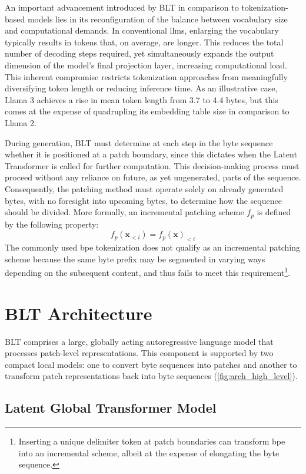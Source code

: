 An important advancement introduced by {\textsc BLT} in comparison to tokenization-based models lies in its reconfiguration of the balance between vocabulary size and computational demands. In conventional llms, enlarging the vocabulary typically results in tokens that, on average, are longer. This reduces the total number of decoding steps required, yet simultaneously expands the output dimension of the model’s final projection layer, increasing computational load. This inherent compromise restricts tokenization approaches from meaningfully diversifying token length or reducing inference time. As an illustrative case, Llama 3 achieves a rise in mean token length from 3.7 to 4.4 bytes, but this comes at the expense of quadrupling its embedding table size in comparison to Llama 2.

During generation, {\textsc BLT} must determine at each step in the byte sequence whether it is positioned at a patch boundary, since this dictates when the Latent Transformer is called for further computation. This decision-making process must proceed without any reliance on future, as yet ungenerated, parts of the sequence. Consequently, the patching method must operate solely on already generated bytes, with no foresight into upcoming bytes, to determine how the sequence should be divided. More formally, an incremental patching scheme $f_p$ is defined by the following property:
$$f_p(\pmb{x}_{<i}) = f_p(\pmb{x})_{<i}$$
The commonly used bpe tokenization does not qualify as an incremental patching scheme because the same byte prefix may be segmented in varying ways depending on the subsequent content, and thus fails to meet this requirement\footnote{Inserting a unique delimiter token at patch boundaries can transform bpe into an incremental scheme, albeit at the expense of elongating the byte sequence.}.

\section{{\textsc BLT} Architecture}
\label{section:architecture}
{\textsc BLT} comprises a large, globally acting autoregressive language model that processes patch-level representations. This component is supported by two compact local models: one to convert byte sequences into patches and another to transform patch representations back into byte sequences (\autoref{fig:arch_high_level}).

\subsection{Latent Global Transformer Model}

